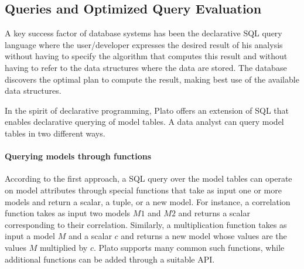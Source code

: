 

\subsection{Queries and Optimized Query Evaluation}
\label{sec:queries}

A key success factor of database systems has been the declarative SQL query language where the user/developer expresses the desired result of his analysis without having to specify the algorithm that computes this result and without having to refer to the data structures where the data are stored. The database discovers the optimal plan to compute the result, making best use of the available data structures. 

In the spirit of declarative programming, Plato offers an extension of SQL that enables declarative querying of model tables. A data analyst can query model tables in two different ways. \\

\paragraph{Querying models through functions} According to the first approach, a SQL query over the model tables can operate on model attributes through special functions that take as input one or more models and return a scalar, a tuple, or a new model. For instance, a correlation function takes as input two models $M1$ and $M2$ and returns a scalar corresponding to their correlation. Similarly, a multiplication function takes as input a model $M$ and a scalar $c$ and returns a new model whose values are the values $M$ multiplied by $c$. Plato supports many common such functions, while additional functions can be added through a suitable API.

